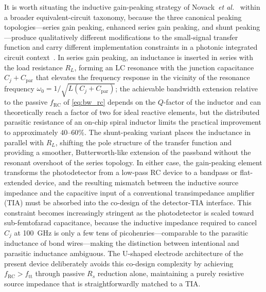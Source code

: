 It is worth situating the inductive gain-peaking strategy of
Novack~\textit{et al.}~\cite{Novack2013} within a broader equivalent-circuit
taxonomy, because the three canonical peaking topologies—series gain peaking,
enhanced series gain peaking, and shunt peaking—produce qualitatively different
modifications to the small-signal transfer function and carry different
implementation constraints in a photonic integrated circuit
context~\cite{Yan2024}. In series gain peaking, an inductance is inserted in
series with the load resistance $R_L$, forming an LC resonance with the junction
capacitance $C_j + C_{\mathrm{par}}$ that elevates the frequency response in
the vicinity of the resonance frequency $\omega_0 = 1/\sqrt{L(C_j +
C_{\mathrm{par}})}$; the achievable bandwidth extension relative to the passive
$f_{\mathrm{RC}}$ of \cref{eq:bw_rc} depends on the $Q$-factor of the inductor
and can theoretically reach a factor of two for ideal reactive elements, but
the distributed parasitic resistance of an on-chip spiral inductor limits the
practical improvement to approximately $40$--$60\%$. The shunt-peaking variant
places the inductance in parallel with $R_L$, shifting the pole structure of
the transfer function and providing a smoother, Butterworth-like extension of
the passband without the resonant overshoot of the series topology. In either
case, the gain-peaking element transforms the photodetector from a low-pass
RC device to a bandpass or flat-extended device, and the resulting mismatch
between the inductive source impedance and the capacitive input of a
conventional transimpedance amplifier (TIA) must be absorbed into the
co-design of the detector-TIA interface. This constraint becomes increasingly
stringent as the photodetector is scaled toward sub-femtofarad capacitance,
because the inductive impedance required to cancel $C_j$ at \SI{100}{\giga\hertz}
is only a few tens of picohenries—comparable to the parasitic inductance of
bond wires—making the distinction between intentional and parasitic inductance
ambiguous. The U-shaped electrode architecture of the present device deliberately
avoids this co-design complexity by achieving $f_{\mathrm{RC}} > f_{\mathrm{tt}}$
through passive $R_s$ reduction alone, maintaining a purely resistive source
impedance that is straightforwardly matched to a TIA.




